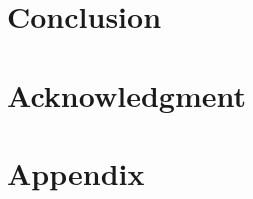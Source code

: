 \documentclass{article}
\begin{document}
%


%



\section{Conclusion}\label{sec:Conclusion}


\section{Acknowledgment}\label{sec:acknowledgment}






\appendix

\section{Appendix}\label{sec:appendix}

\end{document}
